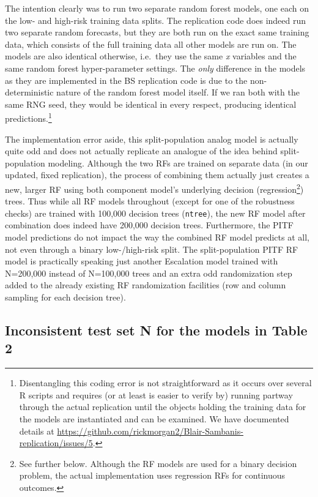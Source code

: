 \documentclass[]{article}
\let\rmarkdownfootnote\footnote%
\def\footnote{\protect\rmarkdownfootnote}
\begin{document}
The intention clearly was to run two separate random forest models, one
each on the low- and high-risk training data splits. The replication
code does indeed run two separate random forecasts, but they are both
run on the exact same training data, which consists of the full training
data all other models are run on. The models are also identical
otherwise, i.e.~they use the same \emph{x} variables and the same random
forest hyper-parameter settings. The \emph{only} difference in the
models as they are implemented in the BS replication code is due to the
non-deterministic nature of the random forest model itself. If we ran
both with the same RNG seed, they would be identical in every respect,
producing identical predictions.\footnote{Disentangling this coding
  error is not straightforward as it occurs over several R scripts and
  requires (or at least is easier to verify by) running partway through
  the actual replication until the objects holding the training data for
  the models are instantiated and can be examined. We have documented
  details at
  \url{https://github.com/rickmorgan2/Blair-Sambanis-replication/issues/5}.}

The implementation error aside, this split-population analog model is
actually quite odd and does not actually replicate an analogue of the
idea behind split-population modeling. Although the two RFs are trained
on separate data (in our updated, fixed replication), the process of
combining them actually just creates a new, larger RF using both
component model's underlying decision (regression\footnote{See further
  below. Although the RF models are used for a binary decision problem,
  the actual implementation uses regression RFs for continuous outcomes.})
trees. Thus while all RF models throughout (except for one of the
robustness checks) are trained with 100,000 decision trees
(\texttt{ntree}), the new RF model after combination does indeed have
200,000 decision trees. Furthermore, the PITF model predictions do not
impact the way the combined RF model predicts at all, not even through a
binary low-/high-risk split. The split-population PITF RF model is
practically speaking just another Escalation model trained with
N=200,000 instead of N=100,000 trees and an extra odd randomization step
added to the already existing RF randomization facilities (row and
column sampling for each decision tree).

\hypertarget{inconsistent-test-set-n-for-the-models-in-table-2}{%
\subsection{Inconsistent test set N for the models in Table
2}\label{inconsistent-test-set-n-for-the-models-in-table-2}}
\end{document}
